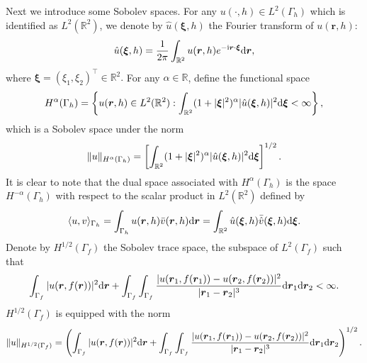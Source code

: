 \documentclass[final,leqno]{siamltex}
\begin{document}
Next we introduce some Sobolev spaces. For any $u(\cdot, h) \in L^2(\Gamma_h)$
which is identified as $L^2(\mathbb{R}^2)$, we denote by $\hat{u}(\boldsymbol\xi, h)$ 
the Fourier transform of $u (\boldsymbol r, h)$:
\[
\hat u (\boldsymbol \xi, h)=\frac{1}{2 \pi}\int_{\mathbb R^2} u (\boldsymbol r,
h) e^{-{\rm i} \boldsymbol r \cdot \boldsymbol  \xi} {\rm d}
\boldsymbol r,
\]
where $\boldsymbol \xi = (\xi_1, \xi_2)^\top \in \mathbb R^2.$ For any
$\alpha\in\mathbb{R}$, define the functional space
 \[
 H^\alpha(\Gamma_h)=\left\{ u (\boldsymbol r, h) \in L^2
(\mathbb R^2):  \int_{\mathbb R^2} (1+ |\boldsymbol \xi|^2)^{\alpha} |\hat
u(\boldsymbol\xi, h)|^2{\rm d}\boldsymbol  \xi < \infty \right\},
 \]
which is a Sobolev space under the norm
\[
\|u\|_{H^{\alpha} (\Gamma_h)} =\left[ \int_{\mathbb R^2} (1+ |\boldsymbol
\xi|^2)^{\alpha} |\hat u(\boldsymbol\xi, h)|^2 {\rm d} \boldsymbol  \xi
\right]^{1/2}.
\]
It is clear to note that the dual space associated with $H^{\alpha} (\Gamma_h)$
is the space $H^{- \alpha} (\Gamma_h)$ with respect to the scalar
product in $L^2 (\mathbb R^2)$ defined by
\[
\langle u,  v \rangle_{\Gamma_h} =\int_{\Gamma_h}u(\boldsymbol r,
h)\bar{v}(\boldsymbol r, h){\rm d}\boldsymbol{r}=\int_{\mathbb R^2} \hat
u(\boldsymbol\xi, h) \bar {\hat v}(\boldsymbol\xi, h) {\rm d }\boldsymbol\xi.
\]
Denote by $H^{1/2}(\Gamma_f)$ the Sobolev trace space, the subspace of
$L^2(\Gamma_f)$ such that
\[
 \int_{\Gamma_f}|u(\boldsymbol r, f(\boldsymbol r))|^2{\rm d}\boldsymbol r
 +\int_{\Gamma_f}\int_{\Gamma_f}\frac{|u(\boldsymbol r_1,
f(\boldsymbol r_1))-u(\boldsymbol r_2, f(\boldsymbol r_2))|^2}{|\boldsymbol r_1
-\boldsymbol r_2|^3}{\rm d}\boldsymbol r_1{\rm d}\boldsymbol r_2<\infty.
\]
$H^{1/2}(\Gamma_f)$ is equipped with the norm
\[
 \|u\|_{H^{1/2}(\Gamma_f)}=\left( \int_{\Gamma_f}|u(\boldsymbol r, f(\boldsymbol
r))|^2{\rm d}\boldsymbol r  +\int_{\Gamma_f}\int_{\Gamma_f}\frac{|u(\boldsymbol
r_1, f(\boldsymbol r_1))-u(\boldsymbol r_2, f(\boldsymbol r_2))|^2}{|\boldsymbol
r_1 -\boldsymbol r_2|^3}{\rm d}\boldsymbol r_1{\rm d}\boldsymbol r_2
\right)^{1/2}.
\]
\end{document}
